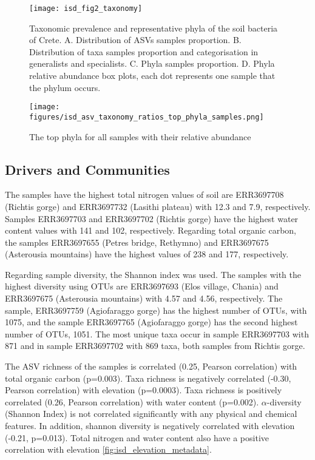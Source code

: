 \begin{figure}[hbt!] 
    \centering\texttt{[image: isd\_fig2\_taxonomy]}
    \caption{Taxonomic prevalence and representative phyla of the soil bacteria of Crete. 
    A. Distribution of ASVs samples proportion. B. Distribution of taxa samples
proportion and categorisation in generalists and specialists. C. Phyla samples proportion.
D. Phyla relative abundance box plots, each dot represents one sample that the phylum occurs.}
    \label{fig:isd_fig2_taxonomy}
\end{figure}


\begin{figure}[hbt!]
      \centering
      \texttt{[image: figures/isd\_asv\_taxonomy\_ratios\_top\_phyla\_samples.png]}
      \caption[Top phyla of each samples]{The top phyla for all samples with their relative abundance}
      \label{fig:isd_top_phyla_samples}
\end{figure}
   

\subsection{Drivers and Communities}\label{isd_communities}

The samples have the highest total nitrogen values of soil are
ERR3697708 (Richtis gorge) and ERR3697732 (Lasithi plateau) with 12.3 and 7.9, respectively.
Samples ERR3697703 and ERR3697702 (Richtis gorge) have the highest water content values with 141 and 102, respectively.
Regarding total organic carbon, the samples ERR3697655 (Petres bridge, Rethymno)
and ERR3697675 (Asterousia mountains) have the highest values of 238 and 177, respectively.

Regarding sample diversity, the Shannon index was used.
The samples with the highest diversity using OTUs are ERR3697693 (Elos village, Chania) and
ERR3697675 (Asterousia mountains) with 4.57 and 4.56, respectively.
The sample, ERR3697759 (Agiofaraggo gorge) has the highest number of OTUs, with 1075,
and the sample ERR3697765 (Agiofaraggo gorge) has the second highest number of OTUs, 1051.
The most unique taxa occur in sample ERR3697703 with 871 and in sample ERR3697702
with 869 taxa, both samples from Richtis gorge.

The ASV richness of the samples is correlated (0.25, Pearson correlation) with total organic carbon (p=0.003).
Taxa richness is negatively correlated (-0.30, Pearson correlation) with elevation (p=0.0003). 
Taxa richness is positively correlated (0.26, Pearson correlation) with water content (p=0.002).
$\alpha$-diversity (Shannon Index) is not correlated significantly with any physical and chemical features.
In addition, shannon diversity is negatively correlated with elevation (-0.21, p=0.013).
Total nitrogen and water content also have a positive correlation with elevation \ref{fig:isd_elevation_metadata}. 

